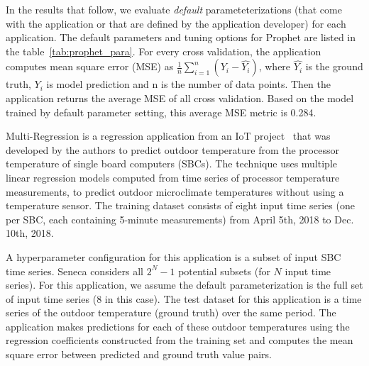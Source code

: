 In the results that follow, we evaluate \textit{default} parameteterizations (that come with 
the application or that are defined by the application developer) for each application.  
The default parameters and tuning options for Prophet are listed in the table~\ref{tab:prophet_para}. For every cross validation, the application computes mean square error (MSE) as $\frac{1}{n}\sum_{i=1}^{n}(Y_i - \hat{Y_i})$, where $\hat{Y_i}$ is the ground truth, $Y_i$ is model prediction and n is the number of data points. Then the application returns the average MSE of all cross validation. Based on the model trained by default parameter setting, this average MSE metric is 0.284.


Multi-Regression is a regression application 
from an IoT project~\cite{iot-cpu} that was developed by the authors
to predict outdoor temperature from the processor 
temperature of single board computers (SBCs).  
The technique uses multiple linear regression models computed from time
series of processor temperature measurements,
to predict outdoor microclimate temperatures without using a temperature sensor.
The training dataset consists of eight input time series (one per SBC, each containing 
5-minute measurements) from April 5th, 2018 to Dec. 10th, 2018.

A hyperparameter configuration for this application is a subset of input SBC time series.
Seneca considers all \texttt{$2^N - 1$} potential subsets (for $N$ input time series).
For this application,
we assume the default parameterization is the full set of input time series (8 in this case).
The test dataset for this application is a time series of the outdoor temperature (ground truth) 
over the same period.  The application makes predictions for each of these outdoor temperatures
using the regression coefficients constructed from the training set
and computes the mean square error between predicted and ground truth value pairs.


